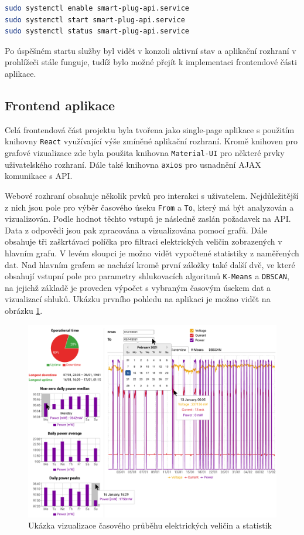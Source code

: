 \documentclass[czech,master,dept460,male,cpp,cpdeclaration,oneside]{diploma}
\begin{document}
\begin{lstlisting}[language=bash,caption=Povolení a start služby]
sudo systemctl enable smart-plug-api.service
sudo systemctl start smart-plug-api.service
sudo systemctl status smart-plug-api.service
\end{lstlisting}

\noindent Po úspěšném startu služby byl vidět v konzoli aktivní stav a aplikační rozhraní v prohlížeči stále funguje, tudíž bylo možné přejít k implementaci frontendové části aplikace.

\pagebreak
\subsection{Frontend aplikace} 
Celá frontendová část projektu byla tvořena jako single-page aplikace s použitím knihovny \texttt{React} využívající výše zmíněné aplikační rozhraní. Kromě knihoven pro grafové vizualizace zde byla použita knihovna \texttt{Material-UI}\autocite{MaterialUI} pro některé prvky uživatelského rozhraní. Dále také knihovna \texttt{axios}\autocite{axios} pro usnadnění AJAX komunikace s API.

Webové rozhraní obsahuje několik prvků pro interakci s uživatelem. Nejdůležitější z nich jsou pole pro výběr časového úseku \texttt{From} a \texttt{To}, který má být analyzován a vizualizován. Podle hodnot těchto vstupů je následně zaslán požadavek na API. Data z odpovědi jsou pak zpracována a vizualizována pomocí grafů. Dále obsahuje tři zaškrtávací políčka pro filtraci elektrických veličin zobrazených v hlavním grafu. V levém sloupci je možno vidět vypočtené statistiky z naměřených dat. Nad hlavním grafem se nachází kromě první záložky také další dvě, ve které obsahují vstupní pole pro parametry shlukovacích algoritmů \texttt{K-Means} a \texttt{DBSCAN}, na jejichž základě je proveden výpočet s vybraným časovým úsekem dat a vizualizací shluků. Ukázku prvního pohledu na aplikaci je možno vidět na obrázku \ref{fig:React1}.

\bigbreak
\begin{figure}[h!]
	\centering
	\includegraphics[width=1\textwidth]{Figures/React1.png}
	\caption{Ukázka vizualizace časového průběhu elektrických veličin a statistik}
	\label{fig:React1}
\end{figure}
\pagebreak
\end{document}
